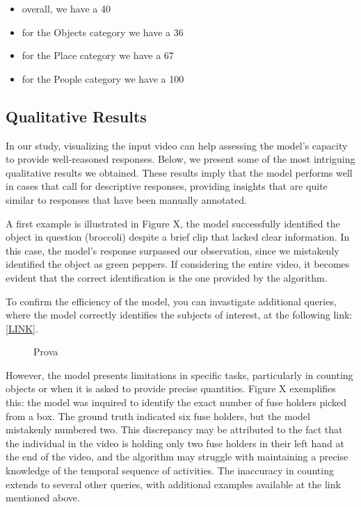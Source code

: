 \documentclass[conference]{IEEEtran}
\begin{document}
\begin{itemize}[before=\footnotesize]
    \item overall, we have a 40%
    \item for the Objects category we have a 36%
    \item for the Place category we have a 67%
    \item for the People category we have a 100%
   
\end{itemize}



\subsection{Qualitative Results}
In our study, visualizing the input video can help assessing the model's capacity to provide well-reasoned responses. Below, we present some of the most intriguing qualitative results we obtained. These results imply that the model performs well in cases that call for descriptive responses, providing insights that are quite similar to responses that have been manually annotated.

A first example is illustrated in Figure X, the model successfully identified the object in question (broccoli) despite a brief clip that lacked clear information. In this case, the model's response surpassed our observation, since we mistakenly identified the object as green peppers. If considering the entire video, it becomes evident that the correct identification is the one provided by the algorithm.

To confirm the efficiency of the model, you can invastigate additional queries, where the model correctly identifies the subjects of interest, at the following link: [\href{https://github.com/Gin549/episodic-memory-pers/tree/main/qualitative_results}{LINK}].

\begin{figure}[ht]
  \centering
  \caption{Prova}
  \label{fig:animation}
\end{figure}

However, the model presents limitations in specific tasks, particularly in counting objects or when it is asked to provide precise quantities. Figure X exemplifies this: the model was inquired to identify the exact number of fuse holders picked from a box. The ground truth indicated six fuse holders, but the model mistakenly numbered two. This discrepancy may be attributed to the fact that the individual in the video is holding only two fuse holders in their left hand at the end of the video, and the algorithm may struggle with maintaining a precise knowledge of the temporal sequence of activities.
The inaccuracy in counting extends to several other queries, with additional examples available at the link mentioned above.
\end{document}
